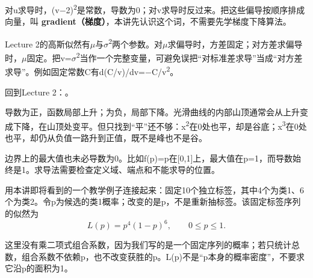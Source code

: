 对u求导时，(v\ensuremath{-}2)\textsuperscript{2}是常数，导数为0；对v求导时反过来。把这些偏导按顺序排成向量，叫 \textbf{gradient（梯度）}，本讲先认识这个词，不需要先学梯度下降算法。


Lecture 2的高斯似然有\ensuremath{\mu}与\ensuremath{\sigma}\textsuperscript{2}两个参数。对\ensuremath{\mu}求偏导时，方差固定；对方差求偏导时，\ensuremath{\mu}固定。把v=\ensuremath{\sigma}\textsuperscript{2}当作一个完整变量，可避免误把“对标准差求导”当成“对方差求导”。例如固定常数C有d(C/v)/dv=\ensuremath{-}C/v\textsuperscript{2}。


回到Lecture 2：。








导数为正，函数局部上升；为负，局部下降。光滑曲线的内部山顶通常会从上升变成下降，在山顶处变平。但只找到“平”还不够：x\textsuperscript{2}在0处也平，却是谷底；x\textsuperscript{3}在0处也平，却仍从负值一路升到正值，既不是峰也不是谷。


边界上的最大值也未必导数为0。比如f(p)=p在[0,1]上，最大值在p=1，而导数始终是1。求导法需要检查定义域、端点和不能求导的位置。


用本讲即将看到的一个教学例子连接起来：固定10个独立标签，其中4个为类1、6个为类2。令p为候选的类1概率；改变的是p，不是重新抽标签。该固定标签序列的似然为
\[
L(p)=p^4(1-p)^6,\qquad 0\le p\le1.\tag{M.20}
\]


这里没有乘二项式组合系数，因为我们写的是一个固定序列的概率；若只统计总数，组合系数不依赖p，也不改变获胜的p。L(p)不是“p本身的概率密度”，不要求它沿p的面积为1。






